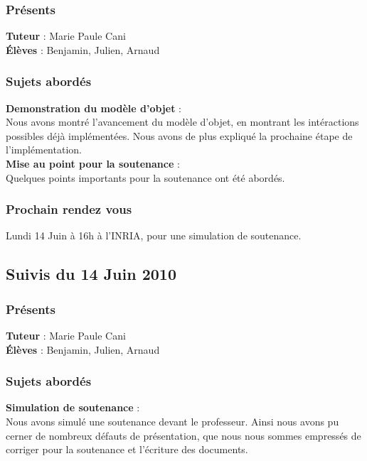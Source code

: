 \documentclass[a4paper,10pt]{article}
\begin{document}
\subsubsection{Présents}
\textbf{Tuteur} : Marie Paule Cani\\
\textbf{Élèves} : Benjamin, Julien, Arnaud \\

\subsubsection{Sujets abordés}

\textbf{Demonstration du modèle d'objet} :  \\
    Nous avons montré l'avancement du modèle d'objet, en montrant les intéractions
    possibles déjà implémentées. Nous avons de plus expliqué la prochaine étape de
    l'implémentation.\\
    
    
\textbf{Mise au point pour la soutenance} :  \\
    Quelques points importants pour la soutenance ont été abordés.\\
     
    
\subsubsection{Prochain rendez vous}
    Lundi 14 Juin à 16h à l'INRIA, pour une simulation de soutenance.\\



\subsection{Suivis du  14 Juin 2010}
\subsubsection{Présents}
\textbf{Tuteur} : Marie Paule Cani\\
\textbf{Élèves} : Benjamin, Julien, Arnaud \\

\subsubsection{Sujets abordés}

\textbf{Simulation de soutenance} :  \\
    Nous avons simulé une soutenance devant le professeur. Ainsi nous avons pu cerner
    de nombreux défauts de présentation, que nous nous sommes empressés de corriger pour
    la soutenance et l'écriture des documents.
\end{document}
